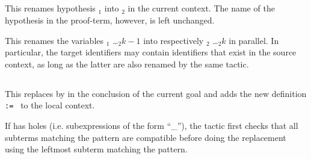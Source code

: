 \subsection{}

This renames hypothesis {\ident$_1$} into {\ident$_2$} in the current
context. The name of the hypothesis in the proof-term, however, is left
unchanged.

\begin{Variants}

\item {}

This renames the variables {\ident$_1$} \ldots {\ident$_2k-1$} into respectively
{\ident$_2$} \ldots {\ident$_2k$} in parallel. In particular, the target
identifiers may contain identifiers that exist in the source context, as long
as the latter are also renamed by the same tactic.

\end{Variants}

\begin{ErrMsgs}
\item {}
\item {}
\end{ErrMsgs}

\subsection{}
\label{tactic:set}

This replaces {\term} by {\ident} in the conclusion of the current goal
and adds the new definition {\tt {\ident} := \term} to the local context.

If {\term} has holes (i.e. subexpressions of the form ``\_''), the
tactic first checks that all subterms matching the pattern are
compatible before doing the replacement using the leftmost subterm
matching the pattern.

\begin{ErrMsgs}
\item {}
\end{ErrMsgs}


